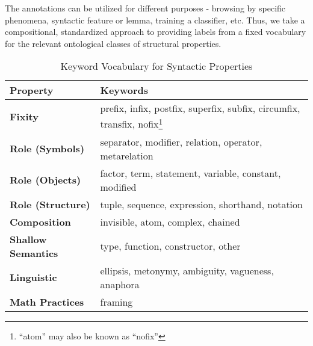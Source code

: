 The annotations can be utilized for different purposes - browsing by specific phenomena, syntactic feature or lemma, training a classifier, etc. Thus, we take a compositional, standardized approach to providing labels from a fixed vocabulary for the relevant ontological classes of structural properties.

\begin{table}
\begin{center}
\begin{tabular}{|l|l|} 
\hline \textbf{Property} & \textbf{Keywords} \\ \hline
\textbf{Fixity} & prefix, infix, postfix, superfix, subfix, circumfix, transfix, nofix\footnote{``atom'' may also be known as ``nofix''} \\[1mm]
\textbf{Role (Symbols)} & separator, modifier, relation,  operator, metarelation \\[1mm]
\textbf{Role (Objects)} & factor, term, statement, variable, constant, modified \\[1mm]
\textbf{Role (Structure)} & tuple, sequence, expression, shorthand, notation \\[1mm]
\textbf{Composition} & invisible, atom, complex, chained\\[1mm]
\textbf{Shallow Semantics} & type, function, constructor, other \\[1mm]
\textbf{Linguistic} & ellipsis, metonymy, ambiguity, vagueness, anaphora\\[1mm]
\textbf{Math Practices} & framing\\[1mm]
\hline
\end{tabular}
\caption{Keyword Vocabulary for Syntactic Properties}
\end{center}
\end{table}